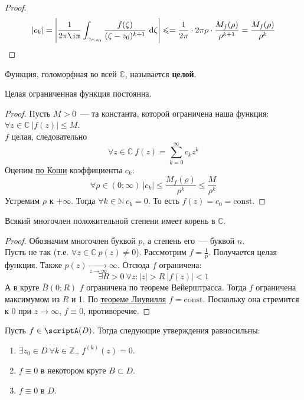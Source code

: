 \documentclass{article}
\begin{document}
    \begin{proof}
        $$
        |c_k|=\left|\frac1{2\pi\im}\int_{\gamma_{r,z_0}}\frac{f(\zeta)}{(\zeta-z_0)^{k+1}}~\mathrm d\zeta\right|\leqslant=\frac1{2\pi}\cdot2\pi\rho\cdot\frac{M_f(\rho)}{\rho^{k+1}}=\frac{M_f(\rho)}{\rho^k}
        $$
    \end{proof}
    \begin{definition}
        Функция, голоморфная во всей $\mathbb C$, называется \textbf{целой}.
    \end{definition}
    \begin{theorem}
        \label{Теорема Лиувилля}
        Целая ограниченная функция постоянна.
    \end{theorem}
    \begin{proof}
        Пусть $M>0$~--- та константа, которой ограничена наша функция: $\forall z\in\mathbb C~|f(z)|\leqslant M$.\\
        $f$ целая, следовательно
        $$
        \forall z\in\mathbb C~f(z)=\sum\limits_{k=0}^\infty c_kz^k
        $$
        Оценим \hyperref[Неравенства Коши для коэффициентов степенного ряда]{по Коши} коэффициенты $c_k$:
        $$
        \forall\rho\in(0;\infty)~|c_k|\leqslant\frac{M_f(\rho)}{\rho^k}\leqslant\frac M{\rho^k}
        $$
        Устремим $\rho$ к $+\infty$. Тогда $\forall k\in\mathbb N~c_k=0$. То есть $f(z)=c_0=\mathrm{const}$.
    \end{proof}
    \begin{theorem}
        \label{Основная теорема высшей алгебры}
        Всякий многочлен положительной степени имеет корень в $\mathbb C$.
    \end{theorem}
    \begin{proof}
        Обозначим многочлен буквой $p$, а степень его~--- буквой $n$.\\
        Пусть не так (т.е. $\forall z\in\mathbb C~p(z)\neq0$). Рассмотрим
        $f=\frac1p$. Получается целая функция. Также $p(z)\underset{z\to\infty}\longrightarrow\infty$. Отсюда $f$ ограничена:
        $$
        \exists R>0~\forall z:|z|>R~|f(z)|<1
        $$
        А в круге $\overline B(0;R)$ $f$ ограничена по теореме Вейерштрасса. Тогда $f$ ограничена максимумом из $R$ и 1. По \hyperref[Теорема Лиувилля]{теореме Лиувилля} $f=\mathrm{const}$. Поскольку она стремится к 0 при $z\to\infty$, $f\equiv0$, противоречие.
    \end{proof}
    \begin{lemma}
        Пусть $f\in\scriptA(D)$. Тогда следующие утверждения равносильны:
        \begin{enumerate}
            \item $\exists z_0\in D~\forall k\in\mathbb Z_+~f^{(k)}(z)=0$.
            \item $f\equiv0$ в некотором круге $B\subset D$.
            \item $f\equiv0$ в $D$.
        \end{enumerate}
    \end{lemma}
\end{document}
